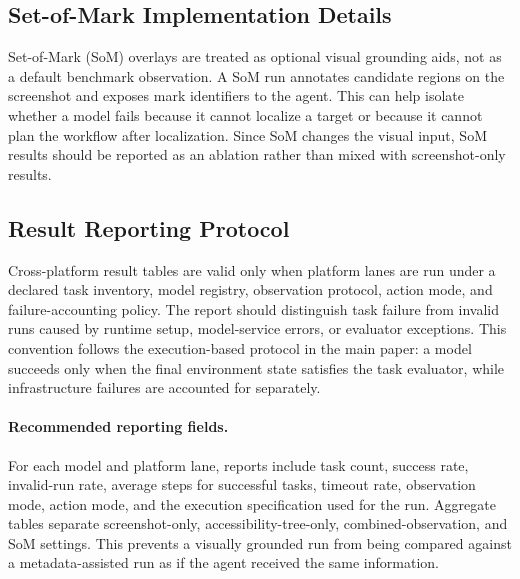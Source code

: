 \subsection{Set-of-Mark Implementation Details}
\label{app:som_details}
Set-of-Mark (SoM) overlays are treated as optional visual grounding aids, not as a default benchmark observation. A SoM run annotates candidate regions on the screenshot and exposes mark identifiers to the agent. This can help isolate whether a model fails because it cannot localize a target or because it cannot plan the workflow after localization. Since SoM changes the visual input, SoM results should be reported as an ablation rather than mixed with screenshot-only results.

\subsection{Result Reporting Protocol}
\label{app:full_results}
Cross-platform result tables are valid only when platform lanes are run under a declared task inventory, model registry, observation protocol, action mode, and failure-accounting policy. The report should distinguish task failure from invalid runs caused by runtime setup, model-service errors, or evaluator exceptions. This convention follows the execution-based protocol in the main paper: a model succeeds only when the final environment state satisfies the task evaluator, while infrastructure failures are accounted for separately.

\paragraph{Recommended reporting fields.}
For each model and platform lane, reports include task count, success rate, invalid-run rate, average steps for successful tasks, timeout rate, observation mode, action mode, and the execution specification used for the run. Aggregate tables separate screenshot-only, accessibility-tree-only, combined-observation, and SoM settings. This prevents a visually grounded run from being compared against a metadata-assisted run as if the agent received the same information.

